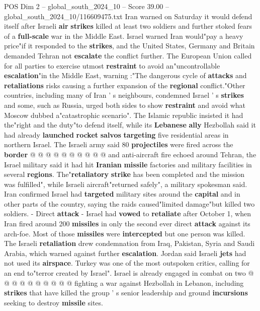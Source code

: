 \begin{textsample}{POS Dim 2 – global\_south\_2024\_10 – Score 39.00 – global\_south\_2024\_10/116609475.txt}  \label{ex:f2_pos_021}
Iran warned on Saturday it would defend itself after Israeli \textbf{air} \textbf{strikes} killed at least two soldiers and further stoked fears of a \textbf{full-scale} war in the Middle East.
Israel warned Iran would"pay a heavy price"if it responded to the \textbf{strikes}, and the United States, Germany and Britain demanded Tehran not \textbf{escalate} the conflict further.
The European Union called for all parties to exercise utmost \textbf{restraint} to avoid an"uncontrollable \textbf{escalation}"in the Middle East, warning :"The dangerous cycle of \textbf{attacks} and \textbf{retaliations} risks causing a further expansion of the \textbf{regional} conflict."Other countries, including many of Iran ' s neighbours, condemned Israel ' s \textbf{strikes} and some, such as Russia, urged both sides to show \textbf{restraint} and avoid what Moscow dubbed a"catastrophic scenario".
The Islamic republic insisted it had the"right and the duty"to defend itself, while its \textbf{Lebanese} \textbf{ally} Hezbollah said it had already \textbf{launched} \textbf{rocket} \textbf{salvos} \textbf{targeting} five residential areas in northern Israel.
The Israeli army said 80 \textbf{projectiles} were fired across the \textbf{border} @ @ @ @ @ @ @ @ @ @ and anti-aircraft fire echoed around Tehran, the Israel military said it had hit \textbf{Iranian} \textbf{missile} factories and military facilities in several \textbf{regions}.
The"\textbf{retaliatory} \textbf{strike} has been completed and the mission was fulfilled", while Israeli aircraft"returned safely", a military spokesman said.
Iran confirmed Israel had \textbf{targeted} military sites around the \textbf{capital} and in other parts of the country, saying the raids caused"limited damage"but killed two soldiers. - Direct \textbf{attack} - Israel had \textbf{vowed} to \textbf{retaliate} after October 1, when Iran fired around 200 \textbf{missiles} in only the second ever direct \textbf{attack} against its arch-foe.
Most of those \textbf{missiles} were \textbf{intercepted} but one person was killed.
The Israeli \textbf{retaliation} drew condemnation from Iraq, Pakistan, Syria and Saudi Arabia, which warned against further \textbf{escalation}.
Jordan said Israeli \textbf{jets} had not used its \textbf{airspace}.
Turkey was one of the most outspoken critics, calling for an end to"terror created by Israel".
Israel is already engaged in combat on two @ @ @ @ @ @ @ @ @ @ fighting a war against Hezbollah in Lebanon, including \textbf{strikes} that have killed the group ' s senior leadership and ground \textbf{incursions} seeking to destroy \textbf{missile} sites.

\end{textsample}

